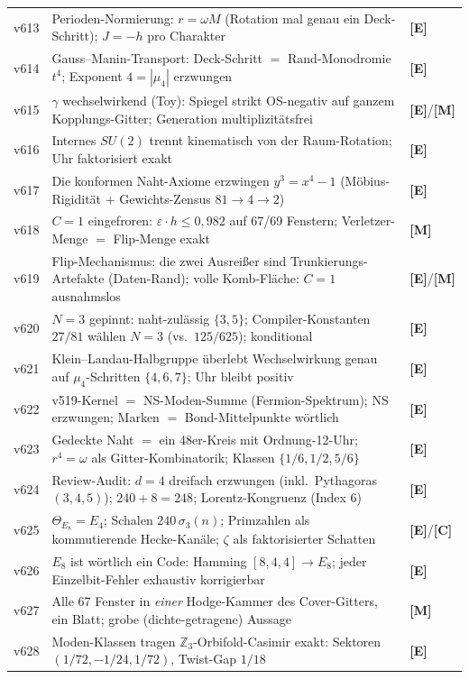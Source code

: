 \documentclass[11pt,a4paper]{article}
\newcommand{\E}{\textcolor{gut}{\textbf{[E]}}}
\newcommand{\C}{\textcolor{kern}{\textbf{[C]}}}
\newcommand{\M}{\textcolor{mess}{\textbf{[M]}}}
\begin{document}
\begin{longtable}{@{}l p{11.1cm} l@{}}
v613 & Perioden-Normierung: $r = \omega M$ (Rotation mal genau ein Deck-Schritt); $J = -h$ pro Charakter & \E \\
v614 & Gauss--Manin-Transport: Deck-Schritt $=$ Rand-Monodromie $t^4$; Exponent $4 = |\mu_4|$ erzwungen & \E \\
v615 & $\gamma$ wechselwirkend (Toy): Spiegel strikt OS-negativ auf ganzem Kopplungs-Gitter; Generation multiplizitätsfrei & \E/\M \\
v616 & Internes $SU(2)$ trennt kinematisch von der Raum-Rotation; Uhr faktorisiert exakt & \E \\
v617 & Die konformen Naht-Axiome erzwingen $y^3 = x^4 - 1$ (Möbius-Rigidität $+$ Gewichts-Zensus $81 \to 4 \to 2$) & \E \\
v618 & $C = 1$ eingefroren: $\varepsilon \cdot h \le 0{,}982$ auf 67/69 Fenstern; Verletzer-Menge $=$ Flip-Menge exakt & \M \\
v619 & Flip-Mechanismus: die zwei Ausreißer sind Trunkierungs-Artefakte (Daten-Rand); volle Komb-Fläche: $C = 1$ ausnahmslos & \E/\M \\
v620 & $N = 3$ gepinnt: naht-zulässig $\{3, 5\}$; Compiler-Konstanten $27/81$ wählen $N = 3$ (vs.\ $125/625$); konditional & \E \\
v621 & Klein--Landau-Halbgruppe überlebt Wechselwirkung genau auf $\mu_4$-Schritten $\{4,6,7\}$; Uhr bleibt positiv & \E \\
v622 & v519-Kernel $=$ NS-Moden-Summe (Fermion-Spektrum); NS erzwungen; Marken $=$ Bond-Mittelpunkte wörtlich & \E \\
v623 & Gedeckte Naht $=$ ein 48er-Kreis mit Ordnung-12-Uhr; $r^4 = \omega$ als Gitter-Kombinatorik; Klassen $\{1/6, 1/2, 5/6\}$ & \E \\
v624 & Review-Audit: $d = 4$ dreifach erzwungen (inkl.\ Pythagoras $(3,4,5)$); $240 + 8 = 248$; Lorentz-Kongruenz (Index 6) & \E \\
v625 & $\Theta_{E_8} = E_4$; Schalen $240\,\sigma_3(n)$; Primzahlen als kommutierende Hecke-Kanäle; $\zeta$ als faktorisierter Schatten & \E/\C \\
v626 & $E_8$ ist wörtlich ein Code: Hamming $[8,4,4] \to E_8$; jeder Einzelbit-Fehler exhaustiv korrigierbar & \E \\
v627 & Alle 67 Fenster in \emph{einer} Hodge-Kammer des Cover-Gitters, ein Blatt; grobe (dichte-getragene) Aussage & \M \\
v628 & Moden-Klassen tragen $\mathbb{Z}_3$-Orbifold-Casimir exakt: Sektoren $(1/72, -1/24, 1/72)$, Twist-Gap $1/18$ & \E \\

\end{longtable}
\end{document}
